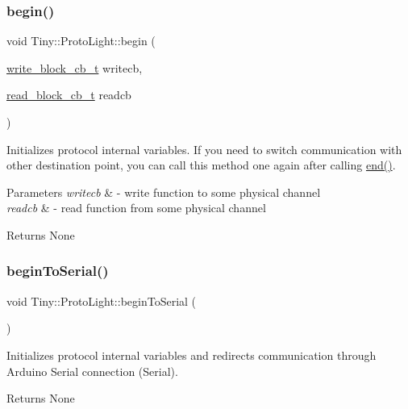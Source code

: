 \subsubsection{\texorpdfstring{begin()}{begin()}}
{\footnotesize\ttfamily void Tiny\+::\+Proto\+Light\+::begin (\begin{DoxyParamCaption}\item[{\hyperlink{tiny__proto__types_8h_a7f69e669de5baa69a43ee5cb439a7496}{write\+\_\+block\+\_\+cb\+\_\+t}}]{writecb,  }\item[{\hyperlink{tiny__proto__types_8h_ae3d867e030f59de94508902f2b84a7ec}{read\+\_\+block\+\_\+cb\+\_\+t}}]{readcb }\end{DoxyParamCaption})}

Initializes protocol internal variables. If you need to switch communication with other destination point, you can call this method one again after calling \hyperlink{classTiny_1_1ProtoLight_a948b2a0e37177b7434581adc64b36497}{end()}. 
\begin{DoxyParams}{Parameters}
{\em writecb} & -\/ write function to some physical channel \\
\hline
{\em readcb} & -\/ read function from some physical channel \\
\hline
\end{DoxyParams}
\begin{DoxyReturn}{Returns}
None 
\end{DoxyReturn}
\mbox{\label{classTiny_1_1ProtoLight_a50bf63fe1891edda48980ca2893485d7}} 
\subsubsection{\texorpdfstring{begin\+To\+Serial()}{beginToSerial()}}
{\footnotesize\ttfamily void Tiny\+::\+Proto\+Light\+::begin\+To\+Serial (\begin{DoxyParamCaption}{ }\end{DoxyParamCaption})}

Initializes protocol internal variables and redirects communication through Arduino Serial connection (Serial). \begin{DoxyReturn}{Returns}
None 
\end{DoxyReturn}
\mbox{\label{classTiny_1_1ProtoLight_a948b2a0e37177b7434581adc64b36497}} 
